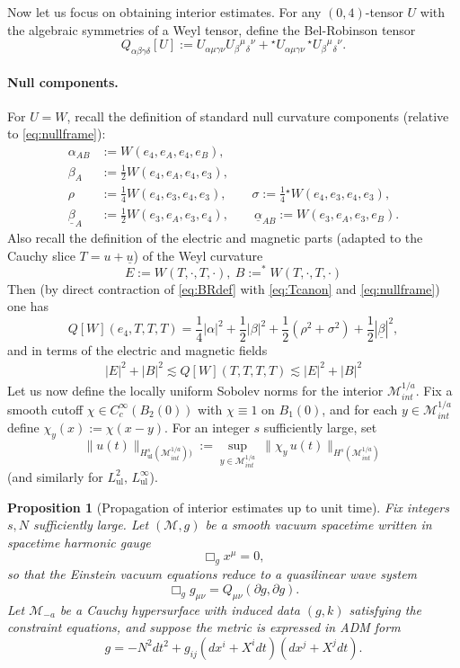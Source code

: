 \documentclass{amsart}
\newtheorem{proposition}{Proposition}[section]
\newcommand{\ubar}{\underline{u}}
\begin{document}
{\noindent Now let us focus on obtaining interior estimates. 
For any $(0,4)$-tensor $U$ with the algebraic symmetries of a Weyl tensor, define the Bel-Robinson tensor
\begin{equation}\label{eq:BRdef}
Q_{\alpha\beta\gamma\delta}[U]
:=
U_{\alpha\mu\gamma\nu}U_{\beta}{}^{\mu}{}_{\delta}{}^{\nu}
+
{}^\star U_{\alpha\mu\gamma\nu}\,{}^\star U_{\beta}{}^{\mu}{}_{\delta}{}^{\nu}.
\end{equation}


\paragraph{Null components.}
For $U=W$, recall the definition of standard null curvature components (relative to \eqref{eq:nullframe}):
\begin{align}
\alpha_{AB}&:=W(e_4,e_A,e_4,e_B),\label{eq:alpha_def}\\
\beta_A&:=\tfrac12 W(e_4,e_A,e_4,e_3),\label{eq:beta_def}\\
\rho&:=\tfrac14 W(e_4,e_3,e_4,e_3),\qquad
\sigma:=\tfrac14 {}^\star W(e_4,e_3,e_4,e_3),\label{eq:rhosigma_def}\\
\underline\beta_A&:=\tfrac12 W(e_3,e_A,e_3,e_4),\qquad
\underline\alpha_{AB}:=W(e_3,e_A,e_3,e_B).\label{eq:under_def}
\end{align}
Also recall the definition of the electric and magnetic parts (adapted to the Cauchy slice $T=u+\ubar$) of the Weyl curvature 
\[
E:=W(T,\cdot,T,\cdot),~B:=^{*}W(T,\cdot,T,\cdot)
\]
Then (by direct contraction of \eqref{eq:BRdef} with \eqref{eq:Tcanon} and \eqref{eq:nullframe}) one has
\begin{equation}\label{eq:flux_explicit}
Q[W](e_4,T,T,T)
=
\frac14|\alpha|^2+\frac12|\beta|^2+\frac12(\rho^2+\sigma^2)
+\frac12|\underline\beta|^2,
\end{equation}
and in terms of the electric and magnetic fields 
\begin{align}
    |E|^{2}+|B|^{2}\lesssim Q[W](T,T,T,T)\lesssim |E|^{2}+|B|^{2}
\end{align}
Let us now define the locally uniform Sobolev norms for the interior $\mathcal{M}^{1/a}_{int}$. Fix a smooth cutoff $\chi\in C_c^\infty(B_2(0))$ with $\chi\equiv1$ on $B_1(0)$, and for each
$y\in\mathcal{M}^{1/a}_{int}$ define $\chi_y(x):=\chi(x-y)$. For an integer $s$ sufficiently large, set
\[
\|u(t)\|_{H^s_{\mathrm{ul}}(\mathcal{M}^{1/a}_{int}))}
:=\sup_{y\in\mathcal{M}^{1/a}_{int}}\ \|\chi_y\,u(t)\|_{H^s(\mathcal{M}^{1/a}_{int})}
\]
(and similarly for $L^2_{\mathrm{ul}},\,L^\infty_{\mathrm{ul}}$). 
\begin{proposition}[Propagation of interior estimates up to unit time]
\label{prop:interior-propagation}
Fix integers $s,N$ sufficiently large. Let $(\mathcal{M},g)$ be a smooth vacuum spacetime written in
spacetime harmonic gauge
\[
\Box_{g}x^{\mu}=0,
\]
so that the Einstein vacuum equations reduce to a quasilinear wave system
\[
\Box_{g} g_{\mu\nu}=Q_{\mu\nu}(\partial g,\partial g).
\]
Let $\mathcal{M}_{-a}$ be a Cauchy hypersurface with induced data $(g,k)$ satisfying the constraint equations,
and suppose the metric is expressed in ADM form
\[
g=-N^{2}dt^{2}+g_{ij}(dx^{i}+X^{i}dt)(dx^{j}+X^{j}dt).
\]


\end{proposition}}
\end{document}
